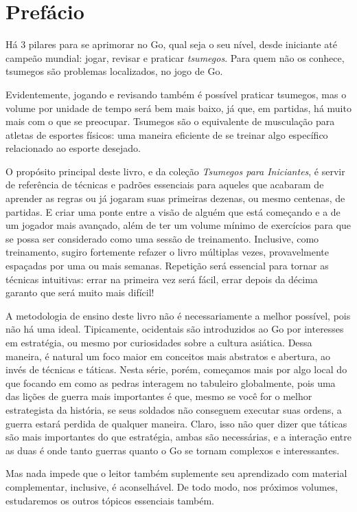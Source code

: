 \chapter{Prefácio}

Há 3 pilares para se aprimorar no Go, qual seja o seu nível, desde iniciante até campeão mundial: jogar, revisar e praticar \emph{tsumegos}. Para quem não os conhece, tsumegos são problemas localizados, no jogo de Go.

Evidentemente, jogando e revisando também é possível praticar tsumegos, mas o volume por unidade de tempo será bem mais baixo, já que, em partidas, há muito mais com o que se preocupar. Tsumegos são o equivalente de musculação para atletas de esportes físicos: uma maneira eficiente de se treinar algo específico relacionado ao esporte desejado.

O propósito principal deste livro, e da coleção \emph{Tsumegos para Iniciantes}, é servir de referência de técnicas e padrões essenciais para aqueles que acabaram de aprender as regras ou já jogaram suas primeiras dezenas, ou mesmo centenas, de partidas. E criar uma ponte entre a visão de alguém que está começando e a de um jogador mais avançado, além de ter um volume mínimo de exercícios para que se possa ser considerado como uma sessão de treinamento. Inclusive, como treinamento, sugiro fortemente refazer o livro múltiplas vezes, provavelmente espaçadas por uma ou mais semanas. Repetição será essencial para tornar as técnicas intuitivas: errar na primeira vez será fácil, errar depois da décima garanto que será muito mais difícil!

A metodologia de ensino deste livro não é necessariamente a melhor possível, pois não há uma ideal. Tipicamente, ocidentais são introduzidos ao Go por interesses em estratégia, ou mesmo por curiosidades sobre a cultura asiática. Dessa maneira, é natural um foco maior em conceitos mais abstratos e abertura, ao invés de técnicas e táticas. Nesta série, porém, começamos mais por algo local do que focando em como as pedras interagem no tabuleiro globalmente, pois uma das lições de guerra mais importantes é que, mesmo se você for o melhor estrategista da história, se seus soldados não conseguem executar suas ordens, a guerra estará perdida de qualquer maneira. Claro, isso não quer dizer que táticas são mais importantes do que estratégia, ambas são necessárias, e a interação entre as duas é onde tanto guerras quanto o Go se tornam complexos e interessantes.

Mas nada impede que o leitor também suplemente seu aprendizado com material complementar, inclusive, é aconselhável. De todo modo, nos próximos volumes, estudaremos os outros tópicos essenciais também.

